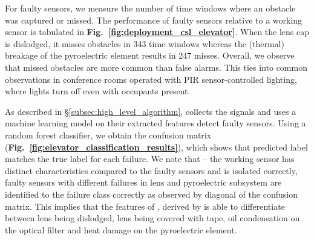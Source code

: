 For faulty sensors, we measure the number of time windows where an obstacle was captured or missed. 
%
The performance of faulty sensors relative to a working sensor is tabulated in {\bfseries Fig.~\ref{fig:deployment_csl_elevator}}. 
When the lens cap is dislodged, it misses obstacles in 343 time windows whereas the (thermal) breakage of the pyroelectric element results in 247 misses. 
%
Overall, we observe that missed obstacles are more common than false alarms.
%
This ties into common observations in conference rooms operated with PIR sensor-controlled lighting, where lights turn off even with occupants present.


As described in \S\ref{subsec:high_level_algorithm}, \sol collects the \aout signals and uses a machine learning model on their extracted features detect faulty sensors. %
%
Using a random forest classifier, we obtain the confusion matrix ({\bfseries Fig.~\ref{fig:elevator_classification_results}}), which shows that predicted label matches the true label for each failure. 
%
We note that -- \ca the working sensor has distinct characteristics compared to the faulty sensors and is isolated correctly, \cb faulty sensors with different failures in lens and pyroelectric subsystem are identified to the failure class correctly as observed by diagonal of the confusion matrix. This implies that the %
features of \aout, derived by \sol is able to differentiate between lens being dislodged, lens being covered with tape, oil condensation on the optical filter and heat damage on the pyroelectric element.


